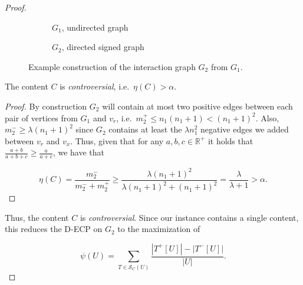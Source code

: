 \begin{proof}
	\begin{figure}
		\begin{center}
			\begin{subfigure}[b]{0.4\textwidth}
				\centering
				\vspace{30pt}
				\caption{$G_{1}$, undirected graph}
				\label{fig:g1_example}
			\end{subfigure}
			\begin{subfigure}[b]{0.4\textwidth}
				\centering
				\caption{$G_{2}$, directed signed graph}
				\label{fig:g2_example}
			\end{subfigure}
		\end{center}
		\caption[Example reduction from MIS to \acrshort{D-ECP}]{Example construction of the interaction graph $G_{2} $ from
			$G_{1}. $}
		\label{fig:construction-densest}
	\end{figure}

	\begin{claim}
		\label{th:claim-controversial-densest}
		The content $C$ is \emph{controversial}, i.e.\ $\eta(C) > \alpha $.
	\end{claim}
	\begin{proof}
		By construction $G_2$ will contain at most two positive edges between each
		pair of vertices from $G_1$ and $v_r$, i.e.\ $m_{2}^{+} \leq n_1 (n_1 +1 ) <
			(n_{1} + 1)^{2}  $. Also, $m_{2}^{-} \geq
			\lambda (n_{1} + 1)^{2} $ since $G_2$ contains at least the $\lambda
			n_1^2$ negative edges we added between $v_r$ and $v_x$.
		Thus, given that for any $a, b, c \in \mathbb{R}^{+}$ it holds that $\frac{a +
				b}{a + b + c} \geq \frac{a}{a + c} $, we have that

		\begin{equation}
			\eta(C) = \frac{m_{2}^{-} }{m_{2}^{-} +
				m_{2}^{+} } \geq \frac{\lambda (n_{1} + 1) ^{2} }{\lambda
				(n_{1} + 1)^{2}
				+ (n_{1} + 1)^{2}  } = \frac{\lambda }{\lambda + 1}
			> \alpha.
		\end{equation}
	\end{proof}

	Thus, the content $C$ is \emph{controversial}. Since our instance contains
	a single content, this reduces the \acrshort{D-ECP} on $G_2$ to the maximization of

	\begin{equation}
		\label{eq:score-densest}
		\psi(U) = \sum^{}_{T \in \mathcal{S}_C(U) } \frac{| T^{+}[U] | - |
			T^{-}[U] |}{|U|}.
	\end{equation}


\end{proof}
